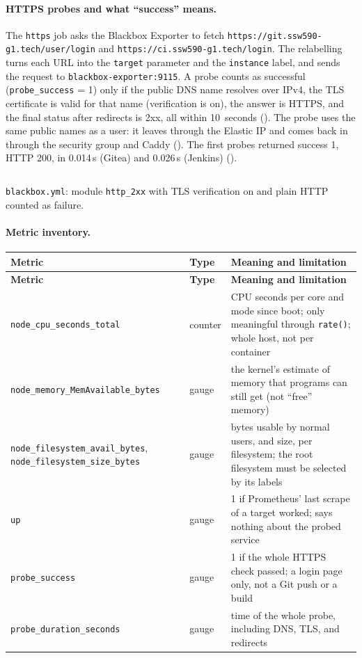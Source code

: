 \paragraph{HTTPS probes and what ``success'' means.} The \texttt{https} job asks the Blackbox Exporter to fetch
\texttt{https://git.ssw590-g1.tech/user/login} and \texttt{https://ci.ssw590-g1.tech/login}. The relabelling turns each
URL into the \texttt{target} parameter and the \texttt{instance} label, and sends the request to
\texttt{blackbox-exporter:9115}. A probe counts as successful (\texttt{probe\_success} = 1) only if the public DNS name
resolves over IPv4, the TLS certificate is valid for that name (verification is on), the answer is HTTPS, and the final
status after redirects is 2xx, all within 10~seconds (). The probe uses the same public names as a
user: it leaves through the Elastic IP and comes back in through the security group and Caddy ().
The first probes returned success 1, HTTP 200, in 0.014\,s (Gitea) and 0.026\,s (Jenkins) ().

\begin{longlisting}
\inputminted[fontsize=\scriptsize]{yaml}{config/monitoring/blackbox/blackbox.yml}
\caption{\texttt{blackbox.yml}: module \texttt{http\_2xx} with TLS verification on and plain HTTP counted as failure.}
\label{Listing:ESreBlackbox}
\end{longlisting}

\paragraph{Metric inventory.}
\begin{tabularx}{\linewidth}{L{4.2cm}L{1.3cm}Y}
\caption{Metrics used in this chapter\label{Table:SreMetrics}}\\
\toprule \textbf{Metric} & \textbf{Type} & \textbf{Meaning and limitation}\\ \midrule
\endfirsthead
\toprule \textbf{Metric} & \textbf{Type} & \textbf{Meaning and limitation}\\ \midrule
\endhead \bottomrule \endlastfoot
\texttt{node\_cpu\_seconds\_total} & counter & CPU seconds per core and mode since boot; only meaningful through \texttt{rate()}; whole host, not per container\\
\texttt{node\_memory\_MemAvailable\_bytes} & gauge & the kernel's estimate of memory that programs can still get (not ``free'' memory)\\
\texttt{node\_filesystem\_avail\_bytes}, \texttt{node\_filesystem\_size\_bytes} & gauge & bytes usable by normal users, and size, per filesystem; the root filesystem must be selected by its labels\\
\texttt{up} & gauge & 1 if Prometheus' last scrape of a target worked; says nothing about the probed service\\
\texttt{probe\_success} & gauge & 1 if the whole HTTPS check passed; a login page only, not a Git push or a build\\
\texttt{probe\_duration\_seconds} & gauge & time of the whole probe, including DNS, TLS, and redirects\\
\end{tabularx}

